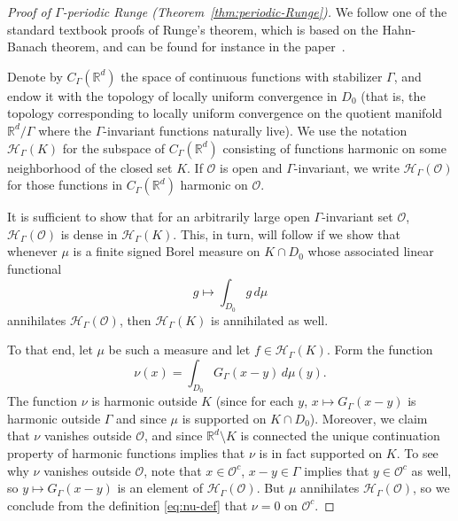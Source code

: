 \documentclass[12pt]{paper}
\numberwithin{equation}{section}
\theoremstyle{plain}
\theoremstyle{definition}
\newcommand{\Rd}{\mathbb{R}^{d}}
\begin{document}
\begin{proof}[Proof of \(\Gamma\)-periodic Runge (Theorem~\ref{thm:periodic-Runge})]
  We follow one of the standard textbook proofs of Runge's theorem, which is based on the
  Hahn-Banach theorem, and can be found for instance in the
  paper~\cite{bagbyUniformHarmonicApproximation1994}.

  Denote by \(C_\Gamma(\Rd)\) the space of continuous functions with stabilizer \(\Gamma\),
  and endow it with the topology of locally uniform convergence in \(D_0\) (that is, the topology
  corresponding to locally uniform convergence on the quotient manifold \(\Rd/\Gamma\)
  where the \(\Gamma\)-invariant functions naturally live).  We use the notation
  \(\mathcal{H}_\Gamma(K)\) for the subspace of \(C_\Gamma(\Rd)\) consisting of functions
  harmonic on some neighborhood of the closed set \(K\). If \(\mathcal{O}\) is open and
  \(\Gamma\)-invariant, we write \(\mathcal{H}_\Gamma(\mathcal{O})\) for those functions in
  \(C_\Gamma(\Rd)\) harmonic on \(\mathcal{O}\).

  It is sufficient to show that for an arbitrarily large open \(\Gamma\)-invariant set
  \(\mathcal{O}\), \(\mathcal{H}_\Gamma(\mathcal{O})\) is dense in \(\mathcal{H}_\Gamma(K)\).  This,
  in turn, will follow if we show that whenever \(\mu\) is a finite signed Borel measure on
  \(K\cap D_0\) whose associated linear functional
  \[
    g\mapsto \int_{D_0}g\, d\mu
  \]
  annihilates \(\mathcal{H}_\Gamma(\mathcal{O})\), then \(\mathcal{H}_\Gamma(K)\) is annihilated as
  well.


  To that end, let \(\mu\) be such a measure and let \(f\in\mathcal{H}_\Gamma(K)\).  Form the
  function
  \begin{equation}
    \label{eq:nu-def}
    \nu(x)=\int_{D_0} G_\Gamma(x-y)\,d\mu(y).
  \end{equation}
  The function \(\nu\) is harmonic outside \(K\) (since for each \(y\), \(x\mapsto G_\Gamma(x-y)\)
  is harmonic outside \(\Gamma\) and since \(\mu\) is supported on \(K\cap D_0\)). Moreover, we
  claim that \(\nu\) vanishes outside \(\mathcal{O}\), and since \(\Rd\setminus K\) is
  connected the unique continuation property of harmonic functions implies that \(\nu\) is in fact
  supported on \(K\).  To see why \(\nu\) vanishes outside \(\mathcal{O}\), note that
  \(x\in\mathcal{O}^c\), \(x-y\in\Gamma\) implies that \(y\in \mathcal{O}^c\) as well, so
  \(y\mapsto G_\Gamma(x-y)\) is an element of \(\mathcal{H}_\Gamma(\mathcal{O})\).  But \(\mu\)
  annihilates \(\mathcal{H}_\Gamma(\mathcal{O})\), so we conclude from the definition
  \eqref{eq:nu-def} that \(\nu=0\) on \(\mathcal{O}^c\).


\end{proof}
\end{document}
